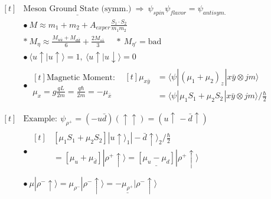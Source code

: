 \documentclass{article}
\newcommand{\hs}{\hspace{1pt}} %
\begin{document}
\vspace{10pt}
\(
    \begin{aligned}[t]
        & \underline{ \text{Meson Ground State (symm.)} } \ \Rightarrow\ \boxed{ \psi_{spin}\psi_{flavor} = \psi_{antisym.} }\\
        & \bullet\ \boxed{ M \approx m_1 + m_2 + A_{exper} \tfrac{S_1 \cdot S_2}{m_1 m_2} }\\
        & \ast\ M_\eta \approx \tfrac{M_{u\bar{u}} + M_{d\bar{d}}}{6} + \tfrac{2M_{s\bar{s}}}{3}
            \hspace{15pt} \ast\ M_{\eta'} = \text{bad}
            \\[5pt]
        & \bullet\ \langle u \uparrow | u \uparrow \rangle = 1,\ \langle u \uparrow | u \downarrow \rangle = 0\\[2pt]
        & \bullet\ \begin{gathered}[t]
                \text{Magnetic Moment}:\\[-2pt]
                \boxed{ \mu_x = g \tfrac{qL}{2m} = \tfrac{q\hbar}{2m} = -\mu_{\bar{x}}}
            \end{gathered} 
            \ \boxed{ \begin{aligned}[t]
                \mu_{x\bar{y}} & = \langle \psi | \hs (\mu_1 + \mu_2)_z \hs | x\bar{y} \otimes jm \rangle\\
                & = \langle \psi | \hs \mu_1 S_1 + \mu_2 S_2  \hs | x\bar{y} \otimes jm \rangle / \tfrac{\hbar}{2}
            \end{aligned} }
            \\
    \end{aligned}
\)
\hfill\vline\hfill
\(
    \begin{aligned}[t]
        & \text{Example}:\ \psi_{\rho^+} = (-u\bar{d})(\uparrow \uparrow) = (u \uparrow \hs {\scriptstyle-} \bar{d} \uparrow)\\[5pt]
        & \bullet\ \begin{aligned}[t]
                & \left[ \mu_{1}S_1 + \mu_{2}S_2 \right] 
                    |u \uparrow \rangle_1 |{\scriptstyle-} \bar{d}\uparrow \rangle_2 / \tfrac{\hbar}{2} 
                    \\[5pt]
                & = \left[ \mu_{u} + \mu_{\bar{d}} \right] | \rho^+ \uparrow \rangle
                    = \underline{ \left[ \mu_{u} - \mu_{d} \right] } | \rho^+ \uparrow \rangle 
                    \\
            \end{aligned}
            \\[5pt]
        & \bullet\ \mu | \rho^- \uparrow \rangle 
            = { \mu_{\rho^-} } | \rho^- \uparrow \rangle 
            = -\underline{\mu_{\rho^+} } | \rho^- \uparrow \rangle
    \end{aligned}
\)
\hfill\hs
\end{document}
